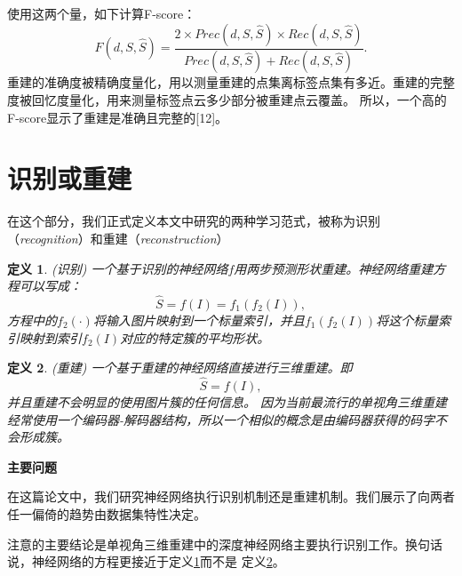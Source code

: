 \documentclass[bachelor, nocolorlinks, printoneside]{seuthesis} %
\newtheorem{theorem}{定义}
\begin{document}
\begin{Main}
使用这两个量，如下计算F-score：
\begin{equation} \label{eq:f-score}
    \textit{F}(\textit{d}, S, \widehat{S}) = \frac{2 \times \textit{Prec}(\textit{d}, S, \widehat{S})\times \textit{Rec}(\textit{d}, S, \widehat{S})}{\textit{Prec}(\textit{d}, S, \widehat{S}) + \textit{Rec}(\textit{d}, S, \widehat{S})}.
\end{equation}
重建的准确度被精确度量化，用以测量重建的点集离标签点集有多近。重建的完整度被回忆度量化，用来测量标签点云多少部分被重建点云覆盖。
所以，一个高的F-score显示了重建是准确且完整的[12]。
\section{识别或重建}
\label{sec:recog_or_recon}
在这个部分，我们正式定义本文中研究的两种学习范式，被称为识别（\emph{recognition}）和重建（\emph{reconstruction}）

\begin{theorem}\label{def:recognition}(识别)
    一个基于识别的神经网络$f$用两步预测形状重建。神经网络重建方程可以写成：
\begin{equation}
        \widehat{S} = f(I) = f_1(f_2(I)),
\end{equation}
方程中的$f_2(\cdot)$将输入图片映射到一个标量索引，并且$f_1(f_2(I))$将这个标量索引映射到索引$f_2(I)$对应的特定簇的平均形状。
\end{theorem}

\begin{theorem}\label{def:reconstruction}(重建)
    一个基于重建的神经网络直接进行三维重建。即\begin{equation}
        \widehat{S} = f(I),
    \end{equation}
并且重建不会明显的使用图片簇的任何信息。
因为当前最流行的单视角三维重建经常使用一个编码器-解码器结构，所以一个相似的概念是由编码器获得的码字不会形成簇。
\end{theorem}
\textbf{主要问题}

在这篇论文中，我们研究神经网络执行识别机制还是重建机制。我们展示了向两者任一偏倚的趋势由数据集特性决定。

注意\cite{tatarchenko2019single}的主要结论是单视角三维重建中的深度神经网络主要执行识别工作。换句话说，神经网络的方程更接近于定义\ref{def:recognition}而不是
定义\ref{def:reconstruction}。

\end{Main}
\end{document}
